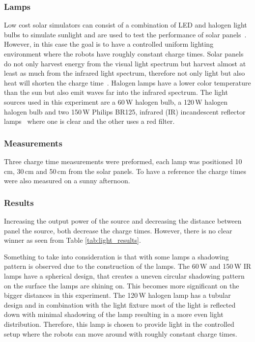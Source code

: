 \subsubsection{Lamps}
Low cost solar simulators can consist of a combination of LED and halogen light bulbs to simulate sunlight and are used to test the performance of solar panels~\cite{grandi_tia_2014}.
However, in this case the goal is to have a controlled uniform lighting environment where the robots have roughly constant charge times.
Solar panels do not only harvest energy from the visual light spectrum but harvest almost at least as much from the infrared light spectrum, therefore not only light but also heat will shorten the charge time~\cite{ixolar_slmd121h04l_2017}.
Halogen lamps have a lower color temperature than the sun but also emit waves far into the infrared spectrum.
The light sources used in this experiment are a 60\,W halogen bulb, a 120\,W halogen halogen bulb and two 150\,W Philips  BR125, infrared (IR) incandescent reflector lamps~\cite{philips_irlamp_2017} where one is clear and the other uses a red filter.

\subsubsection{Measurements}
Three charge time measurements were preformed, each lamp was positioned 10\,cm, 30\,cm and 50\,cm from the solar panels.
To have a reference the charge times were also measured on a sunny afternoon. 

\subsubsection{Results}

Increasing the output power of the source and decreasing the distance between panel the source, both decrease the charge times.
However, there is no clear winner as seen from Table \ref{tab:light_results}.

Something to take into consideration is that with some lamps a shadowing pattern is observed due to the construction of the lamps.
The 60\,W and 150\,W IR lamps have a spherical design, that creates a uneven circular shadowing pattern on the surface the lamps are shining on. 
This becomes more significant on the bigger distances in this experiment.
The 120\,W halogen lamp has a tubular design and in combination with the light fixture most of the light is reflected down with minimal shadowing of the lamp resulting in a more even light distribution.
Therefore, this lamp is chosen to provide light in the controlled setup where the robots can move around with roughly constant charge times.

